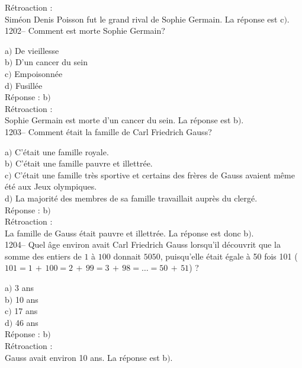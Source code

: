 ﻿\documentclass[letterpaper, 12pt]{article}
\begin{document}
R\'etroaction : \\
Sim\'eon Denis Poisson fut le grand rival de Sophie Germain.
La r\'eponse est c$)$.\\

1202-- Comment est morte Sophie Germain?

a$)$ De vieillesse \\
b$)$ D'un cancer du sein \\
c$)$ Empoisonn\'ee \\
d$)$ Fusill\'ee\\

R\'eponse : b$)$\\

R\'etroaction : \\
Sophie Germain est morte d'un cancer du sein.
La r\'eponse est b$)$.\\

1203-- Comment \'etait la famille de Carl Friedrich Gauss?

a$)$ C'\'etait une famille royale. \\
b$)$ C'\'etait une famille pauvre et illettr\'ee. \\
c$)$ C'\'etait une famille tr\`es sportive et certains des fr\`eres de Gauss
avaient m\^eme \'et\'e aux Jeux olympiques. \\
d$)$ La majorit\'e des membres de sa famille travaillait aupr\`es du
clerg\'e.\\

R\'eponse : b$)$\\

R\'etroaction : \\
La famille de Gauss \'etait pauvre et illettr\'ee.
La r\'eponse est donc b$)$.\\

1204-- Quel \^age environ avait Carl Friedrich Gauss lorsqu'il
d\'ecouvrit que la somme des entiers de $1$ \`a $100$ donnait
$5050$, puisqu'elle \'etait \'egale \`a 50 fois 101
($101=1\,+\,100=2\,+\,99=3\,+\,98=\ldots=50\,+\,51$) ?

a$)$ 3 ans \\
b$)$ 10 ans \\
c$)$ 17 ans \\
d$)$ 46 ans\\

R\'eponse : b$)$\\

R\'etroaction : \\
Gauss avait environ 10 ans.
La r\'eponse est b$)$.\\
\end{document}
